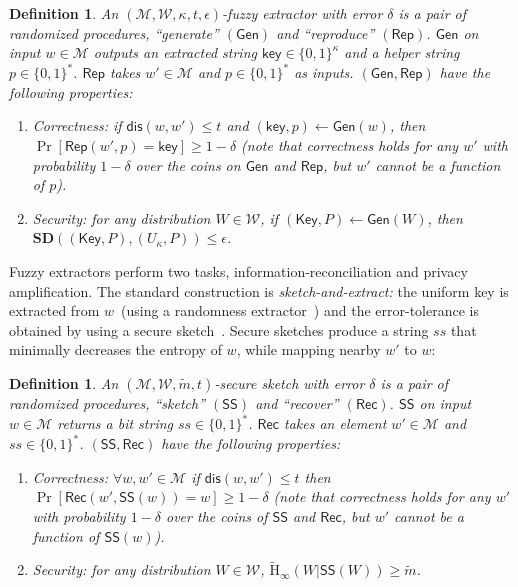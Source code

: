 \documentclass[11pt]{article}
\newcommand{\class}[1]{{\ensuremath{\mathsf{#1}}}}
\newcommand{\key}{\ensuremath{\class{key}}\xspace}
\newcommand{\Key}{\ensuremath{\class{Key}}\xspace}
\newcommand{\gen}{\ensuremath{\class{Gen}}\xspace}
\newcommand{\rep}{\ensuremath{\class{Rep}}\xspace}
\newcommand{\sketch}{\ensuremath{\class{SS}}\xspace}
\newcommand{\rec}{\ensuremath{\class{Rec}}\xspace}
\newcommand{\dis}{\ensuremath{\mathsf{dis}}}
\newcommand{\Hav}{\tilde{\mathrm{H}}_\infty}
\newcommand{\sd}{\ensuremath{\mathbf{SD}}}
\newtheorem{definition}[theorem]{Definition}
\begin{document}
\begin{definition}
\label{def:fuzzy extractor}
An $(\mathcal{M}, \mathcal{W}, \kappa, t, \epsilon)$-\emph{fuzzy extractor} with error $\delta$ is a pair of randomized procedures, ``generate'' $(\gen)$ and ``reproduce'' $(\rep)$. \gen on input $w\in \mathcal{M}$ outputs an extracted string $\key \in\{0,1\}^\kappa$ and a helper string $p\in\{0,1\}^*$. \rep takes $w'\in\mathcal{M}$ and $p\in\{0,1\}^*$ as inputs.   $(\gen, \rep)$ have the following properties:
\begin{enumerate}
\item \emph{Correctness:} if $\dis(w, w')\leq t$ and $(\key, p)\leftarrow \gen(w)$, then $\Pr[\rep(w', p) = \key] \geq 1-\delta$ (note that correctness holds for any $w'$ with probability $1-\delta$ over the coins on $\gen$ and $\rep$, but $w'$ cannot be a function of $p$).
\item \emph{Security:} for any distribution $W\in\mathcal{W}$, if $(\Key,P)\leftarrow\gen (W)$, then $\sd((\Key,P),(U_\kappa,P))\leq \epsilon$.
\end{enumerate}
\end{definition}

\noindent
Fuzzy extractors perform two tasks, information-reconciliation and privacy amplification.  The standard construction is \emph{sketch-and-extract:} the uniform key is extracted from $w$~(using a randomness extractor~\cite{nisan1993randomness}) and the error-tolerance is obtained by using a secure sketch~\cite[Lemma 4.1]{DBLP:journals/siamcomp/DodisORS08}.  Secure sketches produce a string $ss$ that minimally decreases the entropy of $w$, while mapping nearby $w'$ to $w$:
\begin{definition}
\label{def:secure sketch}
An $(\mathcal{M},\mathcal{W}, \tilde{m}, t)$-\emph{secure sketch} with error $\delta$ is a pair of randomized procedures, ``sketch'' $(\sketch)$ and ``recover'' $(\rec)$.  \sketch on input $w\in\mathcal{M}$ returns a bit string $ss\in\{0,1\}^*$.  \rec takes an element $w'\in\mathcal{M}$ and $ss\in\{0,1\}^*$.  $(\sketch, \rec)$ have the following properties:
\begin{enumerate}
\item \emph{Correctness}: $ \forall w, w'\in\mathcal{M}$ if $\dis(w,w')\leq t$ then $\Pr[\rec(w',\sketch(w))=w]\geq 1-\delta$ (note that correctness holds for any $w'$ with probability $1-\delta$ over the coins of $\sketch$ and $\rec$, but $w'$ cannot be a function of $\sketch(w)$).
\item \emph{Security}: for any distribution $W\in\mathcal{W}$, $\Hav(W|\sketch(W))\geq \tilde{m}$.
\end{enumerate}
\end{definition}
\end{document}
